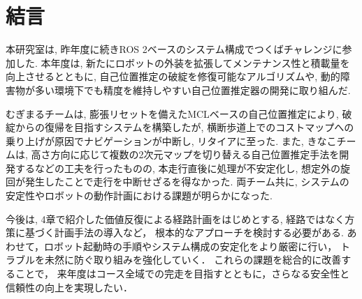 \documentclass[twocolumn,9pt]{jsproceedings}
\begin{document}


\section{結言}
本研究室は, 昨年度に続きROS 2ベースのシステム構成でつくばチャレンジに参加した. 
本年度は, 新たにロボットの外装を拡張してメンテナンス性と積載量を向上させるとともに, 
自己位置推定の破綻を修復可能なアルゴリズムや, 
動的障害物が多い環境下でも精度を維持しやすい自己位置推定器の開発に取り組んだ. 

むぎまるチームは, 
膨張リセットを備えたMCLベースの自己位置推定により, 
破綻からの復帰を目指すシステムを構築したが, 
横断歩道上でのコストマップへの乗り上げが原因でナビゲーションが中断し, 
リタイアに至った. 
また, きなこチームは, 
高さ方向に応じて複数の2次元マップを切り替える自己位置推定手法を開発するなどの工夫を行ったものの, 
本走行直後に処理が不安定化し, 
想定外の旋回が発生したことで走行を中断せざるを得なかった. 
両チーム共に, システムの安定性やロボットの動作計画における課題が明らかになった.

今後は, 4章で紹介した価値反復による経路計画をはじめとする, 
経路ではなく方策に基づく計画手法の導入など，
根本的なアプローチを検討する必要がある. 
あわせて，ロボット起動時の手順やシステム構成の安定化をより厳密に行い，
トラブルを未然に防ぐ取り組みを強化していく．
これらの課題を総合的に改善することで，
来年度はコース全域での完走を目指すとともに，さらなる安全性と信頼性の向上を実現したい．
\end{document}
